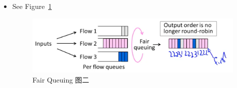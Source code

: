 \documentclass[12pt]{ctexart}   %
\begin{document}
\begin{itemize}
		\item See Figure~\ref{fig:9-4-5}
		  
		 \begin{figure}[h!] %
		\centering
		 \includegraphics[scale=0.7]{images/9-4-5}
		\caption{ Fair Queuing 图二}
		 \label{fig:9-4-5}
		 \end{figure}
		 
	\end{itemize}
	
\end{document}
